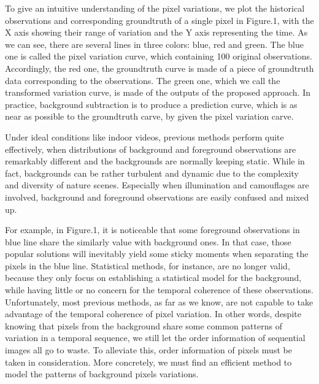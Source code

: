 \documentclass[journal]{IEEEtran}
\begin{document}
To give an intuitive understanding of the pixel variations, we plot the historical observations and corresponding groundtruth of a single pixel in Figure.1, with the X axis showing their range of variation and the Y axis representing the time. 
As we can see, there are several lines in three colors: blue, red and green. 
The blue one is called the pixel variation curve, which containing 100 original observations. 
Accordingly, the red one, the groundtruth curve is made of a piece of groundtruth data corresponding to the observations. 
The green one, which we call the transformed variation curve, is made of the outputs of the proposed approach. 
In practice, background subtraction is to produce a prediction curve, which is as near as possible to the groundtruth carve, by given the pixel variation carve. 


Under ideal conditions like indoor videos, previous methods perform quite effectively, when distributions of background and foreground observations are remarkably different and the backgrounds are normally keeping static. 
While in fact, backgrounds can be rather turbulent and dynamic due to the complexity and diversity of nature scenes. 
Especially when illumination and camouflages are involved, background and foreground observations are easily confused and mixed up. 


For example, in Figure.1, it is noticeable that some foreground observations in blue line share the similarly value with background ones. 
In that case, those popular solutions will inevitably yield some sticky moments when separating the pixels in the blue line. 
Statistical methods, for instance, are no longer valid, because they only focus on establishing a statistical model for the background, while having little or no concern for the temporal coherence of these observations. 
Unfortunately, most previous methods, as far as we know, are not capable to take advantage of the temporal coherence of pixel variation. 
In other words, despite knowing that pixels from the background share some common patterns of variation in a temporal sequence, we still let the order information of sequential images all go to waste. 
To alleviate this, order information of pixels must be taken in consideration. 
More concretely, we must find an efficient method to model the patterns of background pixels variations.
\end{document}
